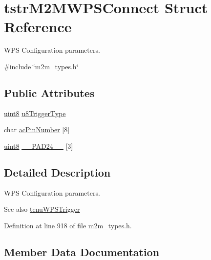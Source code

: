 \hypertarget{structtstrM2MWPSConnect}{}\section{tstr\+M2\+M\+W\+P\+S\+Connect Struct Reference}
\label{structtstrM2MWPSConnect}


W\+PS Configuration parameters.  




{\ttfamily \#include \char`\"{}m2m\+\_\+types.\+h\char`\"{}}

\subsection*{Public Attributes}
\begin{DoxyCompactItemize}
\item 
\hyperlink{group__DataT_ga4df709a77647e870bbf1d955b8edc9a6}{uint8} \hyperlink{structtstrM2MWPSConnect_a13e9ccc529ced2695c513e26af9bb052}{u8\+Trigger\+Type}
\item 
char \hyperlink{structtstrM2MWPSConnect_a19e29b3be2a41d0fc275cac6751a43c1}{ac\+Pin\+Number} \mbox{[}8\mbox{]}
\item 
\hyperlink{group__DataT_ga4df709a77647e870bbf1d955b8edc9a6}{uint8} \hyperlink{structtstrM2MWPSConnect_aee0fce3769118eddd05ed18408205a97}{\+\_\+\+\_\+\+P\+A\+D24\+\_\+\+\_\+} \mbox{[}3\mbox{]}
\end{DoxyCompactItemize}


\subsection{Detailed Description}
W\+PS Configuration parameters. 

\begin{DoxySeeAlso}{See also}
\hyperlink{group__WlanEnums_ga5bbde63fb908694883507ec7295f74f6}{tenu\+W\+P\+S\+Trigger} 
\end{DoxySeeAlso}


Definition at line 918 of file m2m\+\_\+types.\+h.



\subsection{Member Data Documentation}
\mbox{\label{structtstrM2MWPSConnect_aee0fce3769118eddd05ed18408205a97}} 
